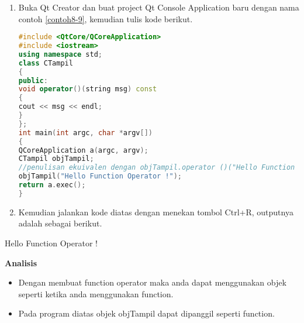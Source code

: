 \begin{enumerate}

\item
  Buka Qt Creator dan buat project Qt Console Application baru dengan
  nama contoh \ref{contoh8-9}, kemudian tulis kode berikut.

\begin{lstlisting}[language=c++, caption=Menggunakan operator() untuk membuat function object, label=contoh8-9]
#include <QtCore/QCoreApplication>
#include <iostream>
using namespace std;
class CTampil
{
public:
void operator()(string msg) const
{
cout << msg << endl;
}
};
int main(int argc, char *argv[])
{
QCoreApplication a(argc, argv);
CTampil objTampil;
//penulisan ekuivalen dengan objTampil.operator ()("Hello Function Operator !");
objTampil("Hello Function Operator !");
return a.exec();
}
\end{lstlisting}
\item
  Kemudian jalankan kode diatas dengan menekan tombol Ctrl+R, outputnya
  adalah sebagai berikut.
\end{enumerate}

\begin{lcverbatim}
Hello Function Operator !
\end{lcverbatim}

\textbf{Analisis}

\begin{itemize}

\item
  Dengan membuat function operator maka anda dapat menggunakan objek
  seperti ketika anda menggunakan function.
\item
  Pada program diatas objek objTampil dapat dipanggil seperti function.
\end{itemize}
